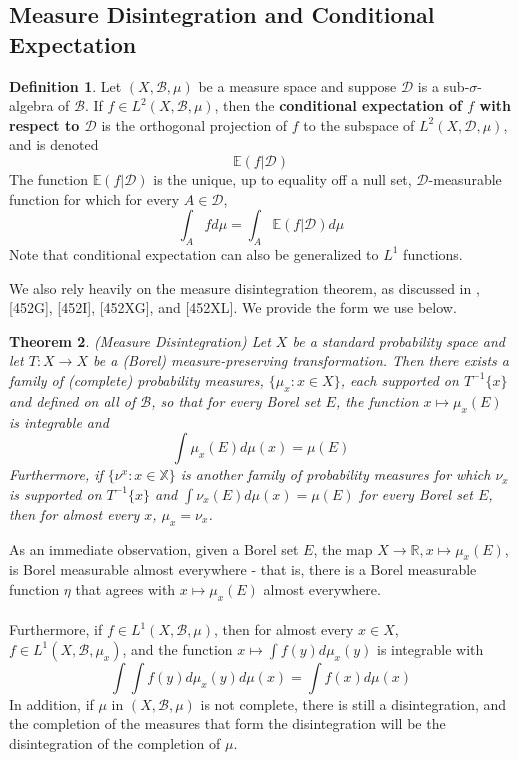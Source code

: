 \documentclass{article}
\newtheorem{theorem}{Theorem}[section]
\theoremstyle{definition}
\newtheorem{definition}[theorem]{Definition}
\begin{document}
\subsection{Measure Disintegration and Conditional Expectation} 
\begin{definition}
    Let $ (X,\mathcal{B},\mu) $ be a measure space and suppose $ \mathcal{D} $ is a sub-$\sigma$-algebra of $ \mathcal{B} $. If $ f\in L^2(X,\mathcal{B},\mu) $, then the \textbf{conditional expectation of $ f $ with respect to $ \mathcal{D} $} is the orthogonal projection of $ f $ to the subspace of $ L^2(X,\mathcal{D},\mu) $, and is denoted
    \[
    \mathbb{E}(f|\mathcal{D})
    \]
    The function $ \mathbb{E}(f|\mathcal{D}) $ is the unique, up to equality off a null set, $ \mathcal{D} $-measurable function for which for every $ A\in \mathcal{D} $,
    \[
    \int_A fd\mu = \int_A \mathbb{E}(f|\mathcal{D})d\mu 
    \]
    Note that conditional expectation can also be generalized to $ L^1 $ functions.
\end{definition}
\noindent We also rely heavily on the measure disintegration theorem, as discussed in \cite{Fremlin2013}, [452G], [452I], [452XG], and [452XL]. We provide the form we use below.
\begin{theorem}\label{disintegration}
    (Measure Disintegration) Let $ X $ be a standard probability space and let $ T:X\rightarrow X $ be a (Borel) measure-preserving transformation. Then there exists a family of (complete) probability measures, $ \{\mu_x:x\in X\} $, each supported on $ T^{-1}\{x\} $ and defined on all of $ \mathcal{B}$, so that for every Borel set $ E $, the function $ x\mapsto \mu_x(E) $ is integrable and
    \[
    \int \mu_x(E)d\mu(x) = \mu(E)
    \]
    Furthermore, if $ \{\nu^x:x\in \mathbb{X}\} $ is another family of probability measures for which $ \nu_x $ is supported on $ T^{-1}\{x\} $ and $ \int \nu_x(E)d\mu(x) = \mu(E) $ for every Borel set $ E $, then for almost every $ x $, $ \mu_x = \nu_x $. 
\end{theorem}
\noindent As an immediate observation, given a Borel set $ E $, the map $ X\rightarrow \mathbb{R}, x\mapsto \mu_x(E) $, is Borel measurable almost everywhere - that is, there is a Borel measurable function $ \eta $ that agrees with $ x\mapsto \mu_x(E) $ almost everywhere.\\\\
Furthermore, if $ f\in L^1(X,\mathcal{B},\mu) $, then for almost every $ x\in X $, $ f\in L^1(X,\mathcal{B},\mu_x) $, and the function $ x\mapsto\int f(y)d\mu_x(y) $ is integrable with
\begin{equation}
    \int \int f(y)d\mu_x(y)d\mu(x) = \int f(x)d\mu(x)
\end{equation}
\noindent In addition, if $ \mu $ in $ (X,\mathcal{B},\mu) $ is not complete, there is still a disintegration, and the completion of the measures that form the disintegration will be the disintegration of the completion of $ \mu $.
\end{document}
